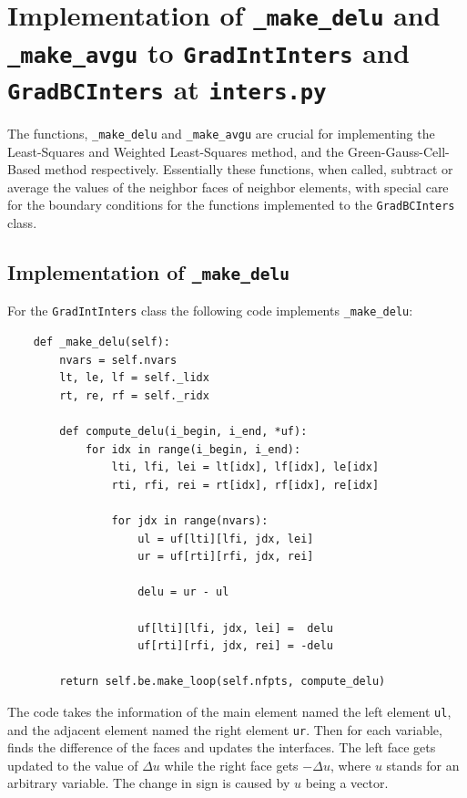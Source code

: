 \documentclass[a4paper, 12pt]{article}
\begin{document}
\section{Implementation of \texttt{\_make\_delu} and \texttt{\_make\_avgu} to \texttt{GradIntInters} and \texttt{GradBCInters} at \texttt{inters.py}} \label{deluavgu}\label{avgu}

The functions, \verb|_make_delu| and \verb|_make_avgu| are crucial for implementing the Least-Squares and Weighted Least-Squares method, and the Green-Gauss-Cell-Based method respectively. Essentially these functions, when called, subtract or average the values of the neighbor faces of neighbor elements, with special care for the boundary conditions for the functions implemented to the \verb|GradBCInters| class.\newpage

\subsection{Implementation of \texttt{\_make\_delu}} \label{delu}

For the \verb|GradIntInters| class the following code implements \verb|_make_delu|:

\begin{verbatim}
    def _make_delu(self):
        nvars = self.nvars
        lt, le, lf = self._lidx
        rt, re, rf = self._ridx

        def compute_delu(i_begin, i_end, *uf):
            for idx in range(i_begin, i_end):
                lti, lfi, lei = lt[idx], lf[idx], le[idx]
                rti, rfi, rei = rt[idx], rf[idx], re[idx]

                for jdx in range(nvars):
                    ul = uf[lti][lfi, jdx, lei]
                    ur = uf[rti][rfi, jdx, rei]

                    delu = ur - ul

                    uf[lti][lfi, jdx, lei] =  delu
                    uf[rti][rfi, jdx, rei] = -delu

        return self.be.make_loop(self.nfpts, compute_delu)
\end{verbatim}
\par

The code takes the information of the main element named the left element \verb|ul|, and the adjacent element named the right element \verb|ur|. Then for each variable, finds the difference of the faces and updates the interfaces. The left face gets updated to the value of $\Delta u$ while the right face gets $-\Delta u$, where $u$ stands for an arbitrary variable. The change in sign is caused by $u$ being a vector.\\\par
\end{document}
